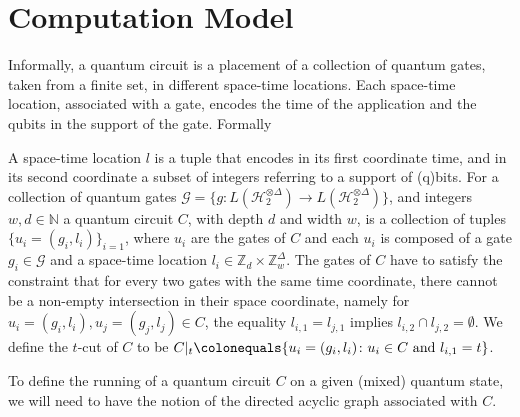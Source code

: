 
\section{Computation Model}

\newcommand{\comDAG}{\pi[C,\mathcal{E}]} 
Informally, a quantum circuit is a placement of a collection of quantum gates, taken from a finite set, in different space-time locations. Each space-time location, associated with a gate, encodes the time of the application and the qubits in the support of the gate. Formally


\begin{definition}
  A space-time location $l$ is a tuple that encodes in its first coordinate time, and in its second coordinate a subset of integers referring to a support of (q)bits. 
  For a collection of quantum gates $\mathcal{G} = \{ g \colon L(\mathcal{H}_{2}^{\otimes \Delta} ) \rightarrow L(\mathcal{H}_{2}^{\otimes \Delta} ) \}$, and integers $w,d \in \mathbb{N}$ a quantum circuit $C$, with depth $d$ and width $w$, is a collection of tuples $\{ u_{i} = (g_{i},l_{i}) \}_{i=1}$, where $u_{i}$ are the gates of $C$ and each $u_{i}$ is composed of a gate $g_{i} \in \mathcal{G}$ and a space-time location $l_{i} \in \mathbb{Z}_{d} \times \mathbb{Z}_{w}^{\Delta}$. The gates of $C$ have to satisfy the constraint that for every two gates with the same time coordinate, there cannot be a non-empty intersection in their space coordinate, namely for $u_{i}=(g_{i},l_{i}),u_{j}=(g_{j},l_{j}) \in C$, the equality $l_{i,1} = l_{j,1}$ implies $l_{i,2} \cap l_{j,2} = \emptyset$. 
  We define the $t$-cut of $C$ to be $C|_{t} \colonequals \{ u_{i} = (g_{i},l_{i}) \colon u_{i} \in C \text{ and } l_{i,1} = t \}$.
\end{definition}
To define the running of a quantum circuit $C$ on a given (mixed) quantum state, we will need to have the notion of the directed acyclic graph associated with $C$.

